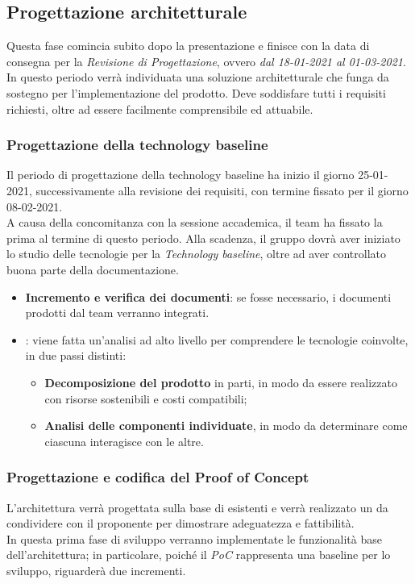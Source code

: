 \subsection{Progettazione architetturale}
Questa fase comincia subito dopo la presentazione e finisce con la data di consegna per la \textit{Revisione di Progettazione}, ovvero \textit{dal 18-01-2021 al 01-03-2021}.\\
In questo periodo verrà individuata una soluzione architetturale che funga da sostegno per l'implementazione del prodotto. Deve soddisfare tutti i requisiti richiesti, oltre ad essere facilmente comprensibile ed attuabile. 

\subsubsection{Progettazione della technology baseline}

Il periodo di progettazione della technology baseline ha inizio il giorno 25-01-2021, successivamente alla revisione dei requisiti, con termine fissato per il giorno 08-02-2021. \\ A causa della concomitanza con la sessione accademica, il team ha fissato la prima  al termine di questo periodo. Alla scadenza, il gruppo dovrà aver iniziato lo studio delle tecnologie per la \textit{Technology baseline}, oltre ad aver controllato buona parte della documentazione.

\begin{itemize}
\item \textbf{Incremento e verifica dei documenti}: se fosse necessario, i documenti prodotti dal team verranno integrati.

 \item {}: viene fatta un'analisi ad alto livello per comprendere le tecnologie coinvolte, in due passi distinti:
\begin{itemize}
 \item \textbf{Decomposizione del prodotto} in parti, in modo da essere realizzato con risorse sostenibili e costi compatibili;
 \item \textbf{Analisi delle componenti individuate}, in modo da determinare come ciascuna interagisce con le altre.  
 
\end{itemize}
\end{itemize}

\subsubsection{Progettazione e codifica del Proof of Concept}
L'architettura verrà progettata sulla base di  esistenti e verrà realizzato un  da condividere con il proponente per dimostrare adeguatezza e fattibilità. \\ 
In questa prima fase di sviluppo verranno implementate le funzionalità base dell'architettura; in particolare, poiché il \textit{PoC} rappresenta una baseline per lo sviluppo, riguarderà due incrementi.

